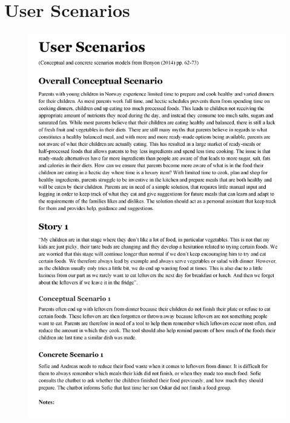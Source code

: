 \section{User Scenarios}
    \label{Userscenarios}
     \begin{figure}
        \centering
        \includegraphics[scale=0.8]{figures/scenario1.pdf}
    \end{figure}
